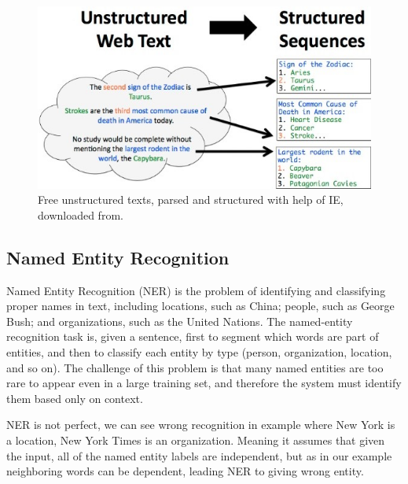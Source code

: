 \documentclass[thesis=M,english]{FITthesis}[2018/05/30]
\begin{document}
	\begin{figure}[H]\centering
		\includegraphics[width=\textwidth]{information-extraction}
		\caption[Information extraction example]{Free unstructured texts, parsed and structured with help of IE, downloaded from\footnotemark \label{fig:InformationExtraction}.}
	\end{figure}


\subsection{Named Entity Recognition}\label{NER subsection}
Named Entity Recognition (NER) \cite{article:NER} is the problem of identifying and classifying proper names in text, including locations, such as China; people, such as George Bush; and organizations, such as the United Nations. The named-entity recognition task is, given a sentence, first to segment which words are part of entities, and then to classify each entity by type (person, organization, location, and so on). The challenge of this problem is that many named entities are too rare to appear even in a large training set, and therefore the system must identify them based only on context.

NER is not perfect, we can see wrong recognition in example where New York is a location, New York Times is an organization. Meaning it assumes that given the input, all of the named entity labels are independent, but as in our example neighboring words can be dependent, leading NER to giving wrong entity.

\end{document}
